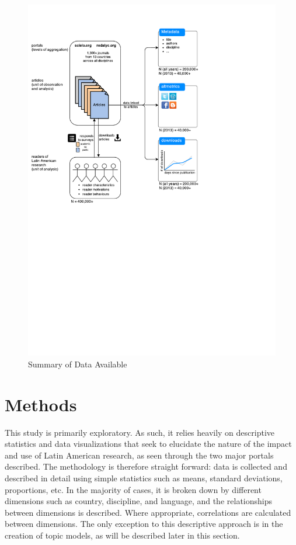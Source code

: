 \begin{figure}[htbp]
\centering
\includegraphics[keepaspectratio,width=\textwidth,height=0.75\textheight]{figures/summary_of_data.pdf}
\caption{Summary of Data Available}
\label{summary_of_data}
\end{figure}

\section{Methods}
\label{methods}

This study is primarily exploratory. As such, it relies heavily on descriptive statistics and data visualizations that seek to elucidate the nature of the impact and use of Latin American research, as seen through the two major portals described. The methodology is therefore straight forward: data is collected and described in detail using simple statistics such as means, standard deviations, proportions, etc. In the majority of cases, it is broken down by different dimensions such as country, discipline, and language, and the relationships between dimensions is described. Where appropriate, correlations are calculated between dimensions. The only exception to this descriptive approach is in the creation of topic models, as will be described later in this section.

